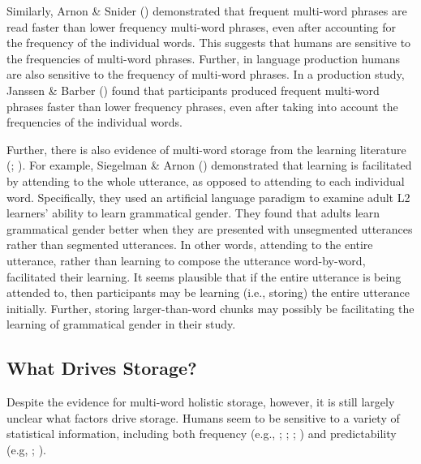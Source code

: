 \documentclass[
  12pt,
  letterpaper,
]{scrreport}
\begin{document}
Similarly, Arnon \& Snider
() demonstrated that
frequent multi-word phrases are read faster than lower frequency
multi-word phrases, even after accounting for the frequency of the
individual words. This suggests that humans are sensitive to the
frequencies of multi-word phrases. Further, in language production
humans are also sensitive to the frequency of multi-word phrases. In a
production study, Janssen \& Barber
() found that
participants produced frequent multi-word phrases faster than lower
frequency phrases, even after taking into account the frequencies of the
individual words.

Further, there is also evidence of multi-word storage from the learning
literature (;
). For example, Siegelman \& Arnon
() demonstrated
that learning is facilitated by attending to the whole utterance, as
opposed to attending to each individual word. Specifically, they used an
artificial language paradigm to examine adult L2 learners' ability to
learn grammatical gender. They found that adults learn grammatical
gender better when they are presented with unsegmented utterances rather
than segmented utterances. In other words, attending to the entire
utterance, rather than learning to compose the utterance word-by-word,
facilitated their learning. It seems plausible that if the entire
utterance is being attended to, then participants may be learning (i.e.,
storing) the entire utterance initially. Further, storing
larger-than-word chunks may possibly be facilitating the learning of
grammatical gender in their study.

\subsection{What Drives Storage?}\label{what-drives-storage}

Despite the evidence for multi-word holistic storage, however, it is
still largely unclear what factors drive storage. Humans seem to be
sensitive to a variety of statistical information, including both
frequency (e.g., ;
;
; ) and predictability (e.g,
;
).
\end{document}
